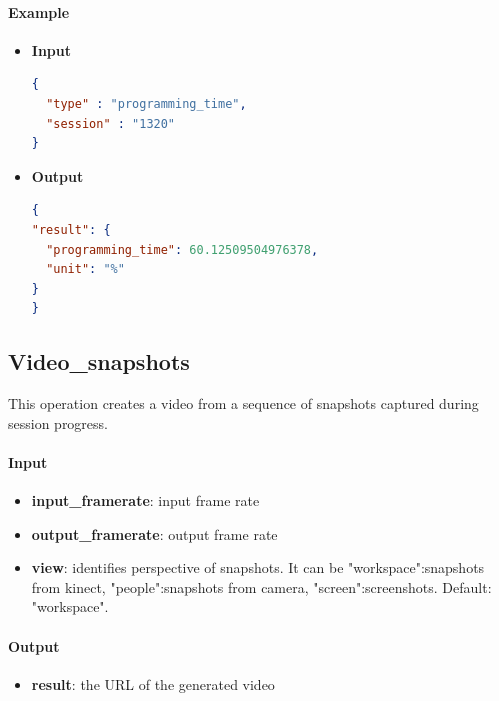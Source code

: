 \documentclass[a4paper,notitlepage,onecolumn]{hitec}  %
\begin{document}
\paragraph{Example}
\begin{itemize}
\item\textbf{Input}
\begin{lstlisting}[language=json,firstnumber=1]
{
  "type" : "programming_time",
  "session" : "1320"
}
\end{lstlisting}
\item\textbf{Output}
\begin{lstlisting}[language=json,firstnumber=1]
{
"result": {
  "programming_time": 60.12509504976378,
  "unit": "%"
}
}
\end{lstlisting}
\end{itemize}

\subsection{Video\_snapshots}
This operation creates a video from a sequence of snapshots captured during session progress.

\paragraph{Input}
\begin{itemize}
\item\textbf{input\_framerate}: input frame rate 
\item\textbf{output\_framerate}: output frame rate
\item\textbf{view}: identifies perspective of snapshots. It can be "workspace":snapshots from kinect, "people":snapshots from camera, "screen":screenshots. Default: "workspace".
\end{itemize}

\paragraph{Output}
\begin{itemize}
\item\textbf{result}: the URL of the generated video
\end{itemize}
\end{document}

